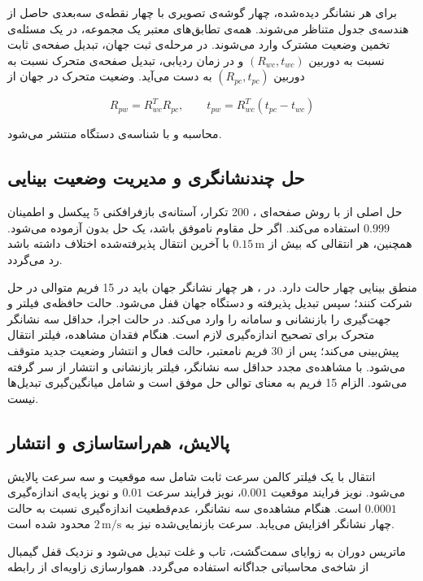 برای هر نشانگر دیده‌شده، چهار گوشه‌ی تصویری با چهار نقطه‌ی سه‌بعدی حاصل از هندسه‌ی جدول متناظر می‌شوند. همه‌ی تطابق‌های معتبر یک مجموعه، در یک مسئله‌ی تخمین وضعیت مشترک وارد می‌شوند. در مرحله‌ی ثبت جهان، تبدیل صفحه‌ی ثابت نسبت به دوربین $(R_{wc},t_{wc})$ و در زمان ردیابی، تبدیل صفحه‌ی متحرک نسبت به دوربین $(R_{pc},t_{pc})$ به دست می‌آید. وضعیت متحرک در جهان از

\begin{equation}
	R_{pw}=R_{wc}^{T}R_{pc},
	\qquad
	t_{pw}=R_{wc}^{T}(t_{pc}-t_{wc})
	\label{eq:method-camera-world-transform}
\end{equation}

محاسبه و با شناسه‌ی دستگاه  منتشر می‌شود.

\subsection{حل چندنشانگری و مدیریت وضعیت بینایی}

حل اصلی از  با روش صفحه‌ای ، 200 تکرار، آستانه‌ی بازفرافکنی 5 پیکسل و اطمینان $0.999$ استفاده می‌کند. اگر حل مقاوم ناموفق باشد، یک حل  بدون  آزموده می‌شود. همچنین، هر انتقالی که بیش از $0.15\,\mathrm m$ با آخرین انتقال پذیرفته‌شده اختلاف داشته باشد رد می‌گردد.

منطق بینایی چهار حالت دارد. در ، هر چهار نشانگر جهان باید در 15 فریم متوالی در حل شرکت کنند؛ سپس تبدیل پذیرفته و دستگاه جهان قفل می‌شود. حالت  حافظه‌ی فیلتر و جهت‌گیری را بازنشانی و سامانه را وارد  می‌کند. در حالت اجرا، حداقل سه نشانگر متحرک برای تصحیح اندازه‌گیری لازم است. هنگام فقدان مشاهده، فیلتر انتقال پیش‌بینی می‌کند؛ پس از 30 فریم نامعتبر، حالت  فعال و انتشار وضعیت جدید متوقف می‌شود. با مشاهده‌ی مجدد حداقل سه نشانگر، فیلتر بازنشانی و انتشار از سر گرفته می‌شود. الزام 15 فریم به معنای توالی حل موفق است و شامل میانگین‌گیری تبدیل‌ها نیست.

\subsection{پالایش، هم‌راستاسازی و انتشار}

انتقال با یک فیلتر کالمن سرعت ثابت شامل سه موقعیت و سه سرعت پالایش می‌شود. نویز فرایند موقعیت $0.001$، نویز فرایند سرعت $0.01$ و نویز پایه‌ی اندازه‌گیری $0.0001$ است. هنگام مشاهده‌ی سه نشانگر، عدم‌قطعیت اندازه‌گیری نسبت به حالت چهار نشانگر افزایش می‌یابد. سرعت بازنمایی‌شده نیز به $2\,\mathrm{m/s}$ محدود شده است.

ماتریس دوران به زوایای سمت‌گشت، تاب و غلت تبدیل می‌شود و نزدیک قفل گیمبال از شاخه‌ی محاسباتی جداگانه استفاده می‌گردد. هموارسازی زاویه‌ای از رابطه

